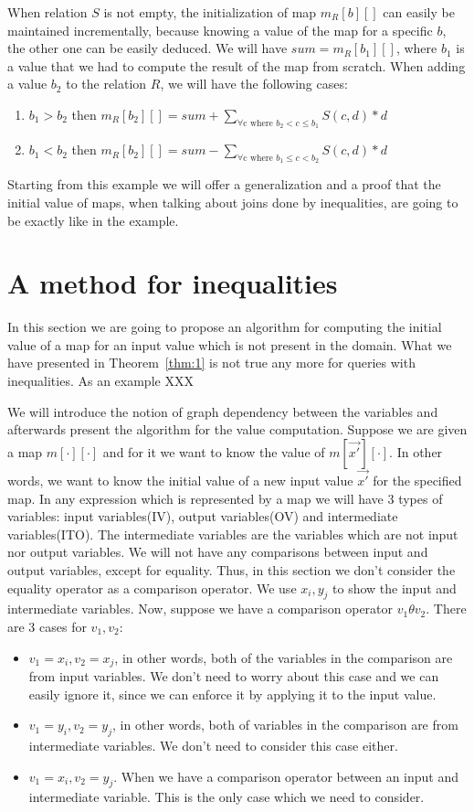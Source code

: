 \documentclass[12pt]{article}
\begin{document}
When relation $S$ is not empty, the initialization of map $m_R[b][]$ can easily be maintained incrementally, because knowing a value of the map for a specific $b$, the other one can be easily deduced. We will have $sum=m_R[b_{1}][]$, where $b_{1}$ is a value that we had to compute the result of the map from scratch. When adding a value $b_{2}$ to the relation $R$, we will have the following cases:

\begin{enumerate}
\item $b_{1}>b_{2}$ then $m_R[b_{2}][]=sum + \sum_{\forall\mbox{c where }b_{2}<c\leq b_{1}} S(c,d)*d$
\item $b_{1}<b_{2}$ then $m_R[b_{2}][]=sum - \sum_{\forall\mbox{c where }b_{1}\leq c<b_{2}} S(c,d)*d$
\end{enumerate}

Starting from this example we will offer a generalization and a proof that the initial value of maps, when talking about joins done by inequalities, are going to be exactly like in the example.
\section{A method for inequalities}
In this section we are going to propose an algorithm for computing the initial value of a map for an input value which is not present in the domain. What we have presented in Theorem~\ref{thm:1} is not true any more for queries with inequalities. As an example XXX

We will introduce the notion of graph dependency between the variables and afterwards present the algorithm for the value computation. Suppose we are given a map $m[\cdot][\cdot]$ and for it we want to know the value of $m[\vec{x'}][\cdot]$. In other words, we want to know the initial value of a new input value $\vec{x'}$ for the specified map. In any expression which is represented by a map we will have 3 types of variables: input variables(IV), output variables(OV) and intermediate variables(ITO). The intermediate variables are the variables which are not input nor output variables. 
We will not have any comparisons between input and output variables, except for equality. Thus, in this section we don't consider the equality operator as a comparison operator. 
We use $x_{i}, y_{j}$ to show the input and intermediate variables. Now, suppose we have a comparison operator $v_{1}\theta v_{2}$. There are 3 cases for $v_{1},v_{2}$: 
\begin{itemize}
\item $v_{1}=x_{i}, v_{2}=x_{j}$, in other words, both of the variables in the comparison are from input variables. We don't need to worry about this case and we can easily ignore it, since we can enforce it by applying it to the input value.
\item $v_{1}=y_{i}, v_{2}=y_{j}$, in other words, both of variables in the comparison are from intermediate variables. We don't need to consider this case either. 
\item $v_{1}=x_{i}, v_{2}=y_{j}$. When we have a comparison operator between an input and intermediate variable. This is the only case which we need to consider. 
\end{itemize}
\end{document}
